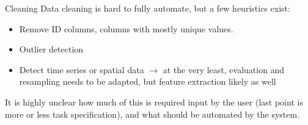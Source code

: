 	\begin{frame}{Cleaning}
		Data cleaning is hard to fully automate, but a few heuristics exist:
		\begin{itemize}
			\item Remove ID columns, columns with mostly unique values.
			\item Outlier detection 
			\item Detect time series or spatial data $\rightarrow$ 
			at the very least, evaluation and resampling needs to be adapted,
			but feature extraction likely as well
		\end{itemize}
		
		\vspace{1cm}
		
		It is highly unclear how much of this is required input by the user
		(last point is more or less task specification),
		and what should be automated by the system. 
		
	\end{frame}
	
